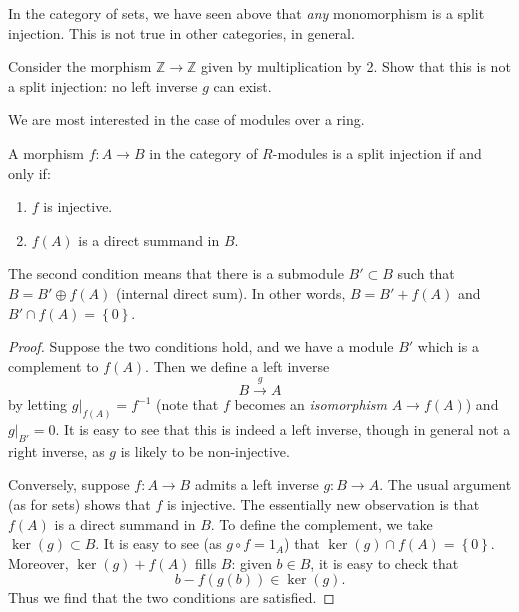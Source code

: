 
In the category of sets, we have seen above that \emph{any} monomorphism is a
split injection. This is not true in other categories, in general.

\begin{exercise} 
Consider the morphism $\mathbb{Z} \to \mathbb{Z}$ given by multiplication by
2. Show that this is not a split injection: no left inverse $g$ can exist.
\end{exercise} 

We are most interested in the case of modules over a ring.

\begin{proposition} 
A morphism $f: A \to B$ in the category of $R$-modules is a split injection if
and only if:
\begin{enumerate}
\item $f$ is injective. 
\item $f(A)$ is a direct summand in $B$.
\end{enumerate}
\end{proposition} 
The second condition means that there is a submodule $B' \subset B$ such that
$B = B' \oplus f(A)$ (internal direct sum). In other words, $B = B'  + f(A)$
and $B' \cap f(A) = \left\{0\right\}$.
\begin{proof} 
Suppose the two conditions hold, and we have a module $B'$ which is a
complement to $f(A)$.
Then we define a left inverse
\[ B \stackrel{g}{\to} A  \]
by letting $g|_{f(A)} = f^{-1}$ (note that $f$ becomes an \emph{isomorphism}
$A \to f(A)$) and $g|_{B'}=0$. It is easy to see that this is indeed a left
inverse, though in general not a right inverse, as $g$ is likely to be
non-injective.

Conversely, suppose $f: A \to B$ admits a left inverse $g: B \to A$. The usual
argument (as for sets) shows that $f$ is injective. The essentially new
observation is that $f(A) $ is a direct summand in $B$. To define the
complement, we take $\ker(g) \subset B$.
It is easy to see (as $g \circ f = 1_A$) that $\ker(g) \cap f(A) =
\left\{0\right\}$. Moreover, $\ker(g) +f(A)$ fills $B$: given $b \in B$, it is
easy to check that
\[ b - f(g(b)) \in \ker(g).  \]
Thus we find that the two conditions are satisfied.
\end{proof} 






